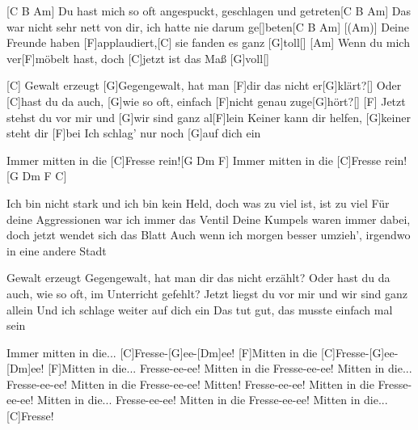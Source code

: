 

\begin{guitar}
	[C B Am] Du hast mich so oft angespuckt, geschlagen und getreten[C B Am]{}
	Das war nicht sehr nett von dir, ich hatte nie darum ge[]beten[C B Am]{}
	[(Am)] Deine Freunde haben [F]applaudiert,[C] sie fanden es ganz [G]toll[]{}
	[Am] Wenn du mich ver[F]möbelt hast, doch [C]jetzt ist das Maß [G]voll[]{}

	[C] Gewalt erzeugt [G]Gegengewalt, hat man [F]dir das nicht er[G]klärt?[]{}
	Oder [C]hast du da auch, [G]wie so oft, einfach [F]nicht genau zuge[G]hört?[]{}
	[F] Jetzt stehst du vor mir und [G]wir sind ganz al[F]lein
	Keiner kann dir helfen, [G]keiner steht dir [F]bei
	Ich schlag' nur noch [G]auf dich ein
	
	Immer mitten in die [C]Fresse rein![G Dm F]{}
	Immer mitten in die [C]Fresse rein![G Dm F C]{}
	
	Ich bin nicht stark und ich bin kein Held, doch was zu viel ist, ist zu viel
	Für deine Aggressionen war ich immer das Ventil
	Deine Kumpels waren immer dabei, doch jetzt wendet sich das Blatt
	Auch wenn ich morgen besser umzieh', irgendwo in eine andere Stadt
	
	Gewalt erzeugt Gegengewalt, hat man dir das nicht erzählt?
	Oder hast du da auch, wie so oft, im Unterricht gefehlt?
	Jetzt liegst du vor mir und wir sind ganz allein
	Und ich schlage weiter auf dich ein
	Das tut gut, das musste einfach mal sein
	
	 
	
	Immer mitten in die...
	[C]Fresse-[G]ee-[Dm]ee! [F]Mitten in die [C]Fresse-[G]ee-[Dm]ee! [F]Mitten in die...
	Fresse-ee-ee! Mitten in die Fresse-ee-ee! Mitten in die...
	Fresse-ee-ee! Mitten in die Fresse-ee-ee! Mitten!
	Fresse-ee-ee! Mitten in die Fresse-ee-ee! Mitten in die...
	Fresse-ee-ee! Mitten in die Fresse-ee-ee! Mitten in die...
	[C]Fresse!
\end{guitar}